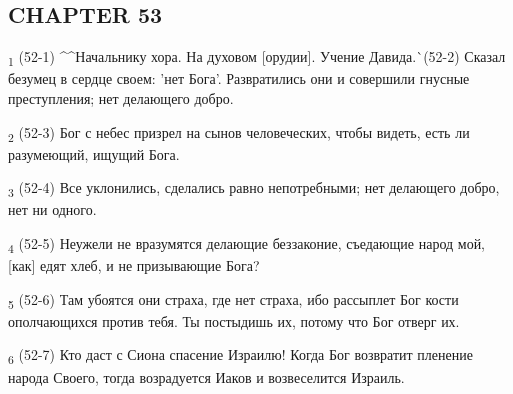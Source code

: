 \subsection{CHAPTER 53}
\begin{tcolorbox}
\textsubscript{1} (52-1) ^^Начальнику хора. На духовом [орудии]. Учение Давида.^^ (52-2) Сказал безумец в сердце своем: 'нет Бога'. Развратились они и совершили гнусные преступления; нет делающего добро.
\end{tcolorbox}
\begin{tcolorbox}
\textsubscript{2} (52-3) Бог с небес призрел на сынов человеческих, чтобы видеть, есть ли разумеющий, ищущий Бога.
\end{tcolorbox}
\begin{tcolorbox}
\textsubscript{3} (52-4) Все уклонились, сделались равно непотребными; нет делающего добро, нет ни одного.
\end{tcolorbox}
\begin{tcolorbox}
\textsubscript{4} (52-5) Неужели не вразумятся делающие беззаконие, съедающие народ мой, [как] едят хлеб, и не призывающие Бога?
\end{tcolorbox}
\begin{tcolorbox}
\textsubscript{5} (52-6) Там убоятся они страха, где нет страха, ибо рассыплет Бог кости ополчающихся против тебя. Ты постыдишь их, потому что Бог отверг их.
\end{tcolorbox}
\begin{tcolorbox}
\textsubscript{6} (52-7) Кто даст с Сиона спасение Израилю! Когда Бог возвратит пленение народа Своего, тогда возрадуется Иаков и возвеселится Израиль.
\end{tcolorbox}
